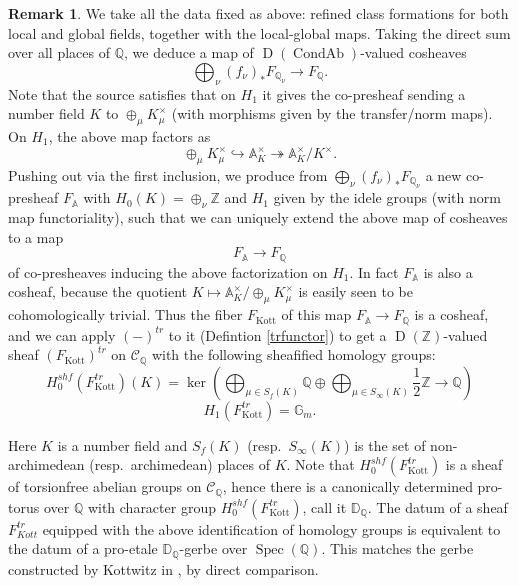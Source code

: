 \documentclass[12pt]{article}
\theoremstyle{definition}
\newtheorem{remark}[theorem]{Remark}
\newcommand{\on}{\operatorname}
\newcommand{\mc}{\mathcal}
\newcommand{\mbb}{\mathbb}
\begin{document}
\begin{remark}\label{globalkottwitz}
We take all the data fixed as above: refined class formations for both local and global fields, together with the local-global maps.   Taking the direct sum over all places of $\mbb{Q}$, we deduce a map of $\on{D}(\on{CondAb})$-valued cosheaves
$$\bigoplus_\nu (f_\nu)_\ast F_{\mbb{Q}_\nu} \to F_\mbb{Q}.$$
Note that the source satisfies that on $H_1$ it gives the co-presheaf sending a number field $K$ to $\oplus_\mu K_\mu^\times$ (with morphisms given by the transfer/norm maps).  On $H_1$, the above map factors as
$$\oplus_\mu K_\mu^\times\hookrightarrow \mbb{A}_K^\times \twoheadrightarrow \mbb{A}_K^\times/K^\times.$$
Pushing out via the first inclusion, we produce from $\bigoplus_\nu (f_\nu)_\ast F_{\mbb{Q}_\nu}$ a new co-presheaf $F_{\mbb{A}}$ with $H_0(K)=\oplus_{\nu}\mbb{Z}$ and $H_1$ given by the idele groups (with norm map functoriality), such that we can uniquely extend the above map of cosheaves to a map
$$F_{\mbb{A}} \to F_{\mbb{Q}}$$
of co-presheaves inducing the above factorization on $H_1$.  In fact $F_{\mbb{A}}$ is also a cosheaf, because the quotient $K\mapsto \mathbb{A}_K^\times/\oplus_\mu K_\mu^\times$ is easily seen to be cohomologically trivial.  Thus the fiber $F_{\on{Kott}}$ of this map $F_\mbb{A}\to F_{\mbb{Q}}$ is a cosheaf, and we can apply $(-)^{tr}$ to it (Defintion \ref{trfunctor}) to get a $\on{D}(\mbb{Z})$-valued sheaf $(F_{\on{Kott}})^{tr}$ on $\mc{C}_\mbb{Q}$ with the following sheafified homology groups:
$$H^{shf}_0(F_{\on{Kott}}^{tr})(K) = \on{ker}\left(\bigoplus_{\mu\in S_f(K)}\mbb{Q}\oplus \bigoplus_{\mu\in S_{\infty}(K)}\frac{1}{2}\mbb{Z}\to \mbb{Q}\right)$$
$$H_1(F_{\on{Kott}}^{tr}) = \mbb{G}_m.$$

Here $K$ is a number field and $S_f(K)$ (resp.\ $S_\infty(K)$) is the set of non-archimedean (resp.\ archimedean) places of $K$.  Note that $H^{shf}_0(F_{\on{Kott}}^{tr})$ is a sheaf of torsionfree abelian groups on $\mc{C}_{\mbb{Q}}$, hence there is a canonically determined pro-torus over $\mbb{Q}$ with character group $H^{shf}_0(F_{\on{Kott}}^{tr})$, call it $\mathbb{D}_\mbb{Q}$.  The datum of a sheaf $F^{tr}_{Kott}$ equipped with the above identification of homology groups is equivalent to the datum of a pro-etale $\mbb{D}_{\mbb{Q}}$-gerbe over $\on{Spec}(\mbb{Q})$.  This matches the gerbe constructed by Kottwitz in \cite{kottwitz}, by direct comparison.


\end{remark}
\end{document}
